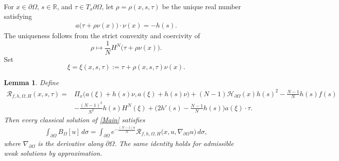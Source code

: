 \documentclass[10pt,a4paper]{amsart}
\numberwithin{equation}{section}
\newtheorem{lemma}[thm]{Lemma}
\newcommand{\pa}{\partial}
\newcommand{\R}{\mathbb{R}}
\begin{document}
For $x\in\partial\Omega$, $s\in\R$, and $\tau\in T_x\partial\Omega$, let $\rho=\rho(x,s,\tau)$ be the
unique real number satisfying
\begin{align}\label{rho-eq}
    a\bigl(\tau+\rho\nu(x)\bigr)\cdot\nu(x)=-h(s).
\end{align}
The uniqueness follows from the strict convexity and coercivity of
\[
    \rho\longmapsto\frac1N H^N\bigl(\tau+\rho\nu(x)\bigr).
\]
Set
\[
    \xi=\xi(x,s,\tau):=\tau+\rho(x,s,\tau)\nu(x).
\]

\begin{lemma}\label{lem:boundary-reduction}
Define
\begin{align}\label{R-density}
    \mathcal R_{f,h,\Omega,H}(x,s,\tau) = & \Pi_x\bigl(a(\xi)+h(s)\nu,a(\xi)+h(s)\nu\bigr) +(N-1) \mathcal{H}_{\pa \Omega}(x)h(s)^2 -\frac{N-1}{N} h(s)f(s) \nonumber\\
    &-\frac{(N-1)^2}{N^2}h(s)H^N(\xi) +\bigg(2h'(s)- \frac{N-1}{N} h(s)\bigg)a(\xi)\cdot\tau .
\end{align}
Then every classical solution of \eqref{Main} satisfies
\begin{align}\label{eq:int-reduction}
    \int_{\partial\Omega}B_\Omega[u]\,d\sigma = \int_{\partial\Omega}e^{- \frac{(N-1)u}{N}} \mathcal R_{f,h,\Omega,H} \bigl(x,u,\nabla_{\pa \Omega} u\bigr)\,d\sigma,
\end{align}
where $\nabla_{\pa \Omega}$ is the derivative along $\pa \Omega$. The same identity holds for admissible weak solutions by
approximation.
\end{lemma}
\end{document}
